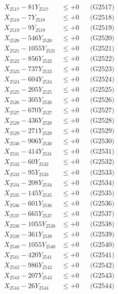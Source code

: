 \documentclass[a4paper,10pt]{article}
\begin{document}
{\begin{align}
X_{2517} - 81Y_{2517} &\leq +0 && \text{(G2517)} \\
X_{2518} - 7Y_{2518} &\leq +0 && \text{(G2518)} \\
X_{2519} - 9Y_{2519} &\leq +0 && \text{(G2519)} \\
X_{2520} - 546Y_{2520} &\leq +0 && \text{(G2520)} \\
\allowbreak
X_{2521} - 1055Y_{2521} &\leq +0 && \text{(G2521)} \\
X_{2522} - 856Y_{2522} &\leq +0 && \text{(G2522)} \\
X_{2523} - 737Y_{2523} &\leq +0 && \text{(G2523)} \\
X_{2524} - 604Y_{2524} &\leq +0 && \text{(G2524)} \\
X_{2525} - 205Y_{2525} &\leq +0 && \text{(G2525)} \\
X_{2526} - 305Y_{2526} &\leq +0 && \text{(G2526)} \\
X_{2527} - 670Y_{2527} &\leq +0 && \text{(G2527)} \\
X_{2528} - 436Y_{2528} &\leq +0 && \text{(G2528)} \\
X_{2529} - 271Y_{2529} &\leq +0 && \text{(G2529)} \\
X_{2530} - 906Y_{2530} &\leq +0 && \text{(G2530)} \\
\allowbreak
X_{2531} - 414Y_{2531} &\leq +0 && \text{(G2531)} \\
X_{2532} - 60Y_{2532} &\leq +0 && \text{(G2532)} \\
X_{2533} - 95Y_{2533} &\leq +0 && \text{(G2533)} \\
X_{2534} - 208Y_{2534} &\leq +0 && \text{(G2534)} \\
X_{2535} - 145Y_{2535} &\leq +0 && \text{(G2535)} \\
X_{2536} - 601Y_{2536} &\leq +0 && \text{(G2536)} \\
X_{2537} - 665Y_{2537} &\leq +0 && \text{(G2537)} \\
X_{2538} - 1055Y_{2538} &\leq +0 && \text{(G2538)} \\
X_{2539} - 361Y_{2539} &\leq +0 && \text{(G2539)} \\
X_{2540} - 1055Y_{2540} &\leq +0 && \text{(G2540)} \\
\allowbreak
X_{2541} - 420Y_{2541} &\leq +0 && \text{(G2541)} \\
X_{2542} - 986Y_{2542} &\leq +0 && \text{(G2542)} \\
X_{2543} - 207Y_{2543} &\leq +0 && \text{(G2543)} \\
X_{2544} - 26Y_{2544} &\leq +0 && \text{(G2544)} \\

\end{align}}
\end{document}
